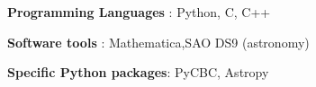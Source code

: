 

\color{black}
\vspace{4 mm}

\begin{cvitems}
    \item \textbf{Programming Languages} : Python, C, C++
    \item \textbf{Software tools} : Mathematica,SAO DS9 (astronomy)
    \item \textbf{Specific Python packages}: PyCBC, Astropy
  \end{cvitems}